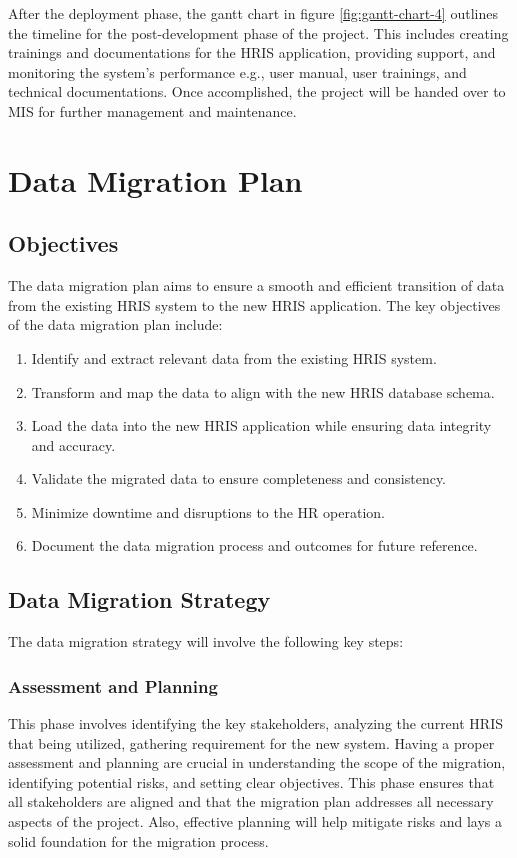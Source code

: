     After the deployment phase, the gantt chart in figure \ref{fig:gantt-chart-4} outlines the timeline for the post-development phase of the project. This includes creating trainings and documentations for the HRIS application, providing support, and monitoring the system's performance e.g., user manual, user trainings, and technical documentations. Once accomplished, the project will be handed over to MIS for further management and maintenance.

\section{Data Migration Plan}

    \subsection{Objectives}

    The data migration plan aims to ensure a smooth and efficient transition of data from the existing HRIS system to the new HRIS application. The key objectives of the data migration plan include:

    \begin{enumerate}
        \item Identify and extract relevant data from the existing HRIS system.
        \item Transform and map the data to align with the new HRIS database schema.
        \item Load the data into the new HRIS application while ensuring data integrity and accuracy.
        \item Validate the migrated data to ensure completeness and consistency.
        \item Minimize downtime and disruptions to the HR operation.
        \item Document the data migration process and outcomes for future reference.
    \end{enumerate}

    \subsection{Data Migration Strategy}

    The data migration strategy will involve the following key steps:
    
        \subsubsection{Assessment and Planning}
            This phase involves identifying the key stakeholders, analyzing the current HRIS that being utilized, gathering requirement for the new system. Having a proper assessment and planning are crucial in understanding the scope of the migration, identifying potential risks, and setting clear objectives. This phase ensures that all stakeholders are aligned and that the migration plan addresses all necessary aspects of the project. Also, effective planning will help mitigate risks and lays a solid foundation for the migration process.

